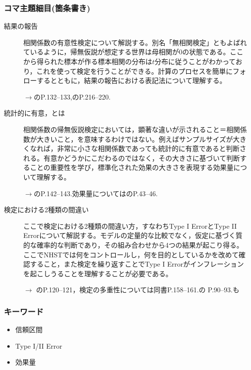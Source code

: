 \subsubsection{コマ主題細目(箇条書き)}
\begin{description}



\item[結果の報告]相関係数の有意性検定について解説する。別名「無相関検定」ともよばれているように，帰無仮説が想定する世界は母相関が0の状態である。ここから得られた標本が作る標本相関の分布は$t$分布に従うことがわかっており，これを使って検定を行うことができる。計算のプロセスを簡単にフォローするとともに，結果の報告における表記法について理解する。
\begin{flushright}
    $\to$\citet{Yamada2004}のP.132--133,\citet{山内201001}のP.216--220.
\end{flushright}

\item[統計的に有意，とは]相関係数の帰無仮説検定においては，顕著な違いが示されること＝相関係数が大きいこと，を意味するわけではない。例えばサンプルサイズが大きくなれば，非常に小さな相関係数であっても統計的に有意であると判断される。有意かどうかにこだわるのではなく，その大きさに基づいて判断することの重要性を学び，標準化された効果の大きさを表現する効果量について理解する。
\begin{flushright}
    $\to$\citet{Yamada2004}のP.142--143.効果量については\citet{大久保201201}のP.43--46.
\end{flushright}


\item[検定における2種類の間違い]ここで検定における2種類の間違い方，すなわちType I ErrorとType II Errorについて解説する。モデルの定量的な比較でなく，仮定に基づく質的な確率的な判断であり，その組み合わせから4つの結果が起こり得る。ここでNHSTでは何をコントロールし，何を目的としているかを改めて確認すること，また検定を繰り返すことでType I Errorがインフレーションを起こしうることを理解することが必要である。
\begin{flushright}
    $\to$ \citet{Yamada2004}のP.120--121，検定の多重性については同書P.158--161.\citet{川端201408}の P.90--93.も
\end{flushright}


\end{description}
\subsubsection{キーワード}
\begin{itemize}
\item 信頼区間
\item Type I/II Error
\item 効果量
\end{itemize}
